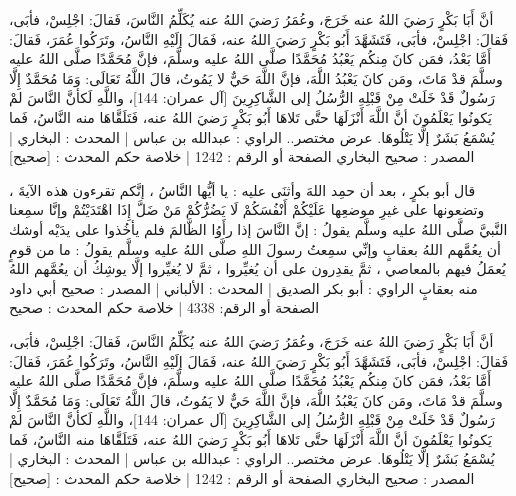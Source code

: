أنَّ أَبَا بَكْرٍ رَضيَ اللهُ عنه خَرَجَ، وعُمَرُ رَضيَ اللهُ عنه يُكَلِّمُ النَّاسَ، فَقالَ: اجْلِسْ، فأبَى، فَقالَ: اجْلِسْ، فأبَى، فَتَشَهَّدَ أَبُو بَكْرٍ رَضيَ اللهُ عنه، فَمَالَ إلَيْهِ النَّاسُ، وتَرَكُوا عُمَرَ، فَقالَ: أَمَّا بَعْدُ، فمَن كانَ مِنكُم يَعْبُدُ مُحَمَّدًا صلَّى اللهُ عليه وسلَّمَ، فإنَّ مُحَمَّدًا صلَّى اللهُ عليه وسلَّمَ قدْ مَاتَ، ومَن كانَ يَعْبُدُ اللَّهَ، فإنَّ اللَّهَ حَيٌّ لا يَمُوتُ، قالَ اللَّهُ تَعَالَى: {وَمَا مُحَمَّدٌ إِلَّا رَسُولٌ قَدْ خَلَتْ مِنْ قَبْلِهِ الرُّسُلُ} إلى {الشَّاكِرِينَ} [آل عمران: 144]، واللَّهِ لَكأنَّ النَّاسَ لمْ يَكونُوا يَعْلَمُونَ أنَّ اللَّهَ أَنْزَلَهَا حتَّى تَلاهَا أَبُو بَكْرٍ رَضيَ اللهُ عنه، فَتَلَقَّاهَا منه النَّاسُ، فَما يُسْمَعُ بَشَرٌ إلَّا يَتْلُوهَا.
عرض مختصر..
الراوي : عبدالله بن عباس | المحدث : البخاري | المصدر : صحيح البخاري
الصفحة أو الرقم : 1242 | خلاصة حكم المحدث : [صحيح] 

قال أبو بكرٍ ، بعد أن حمِد اللهَ وأثنَى عليه : يا أيُّها النَّاسُ ، إنَّكم تقرءون هذه الآيةَ ، وتضعونها على غيرِ موضعِها عَلَيْكُمْ أَنْفُسَكُمْ لَا يَضُرُّكُمْ مَنْ ضَلَّ إِذَا اهْتَدَيْتُمْ وإنَّا سمِعنا النَّبيَّ صلَّى اللهُ عليه وسلَّم يقولُ : إنَّ النَّاسَ إذا رأَوُا الظَّالمَ فلم يأخُذوا على يدَيْه أوشك أن يعُمَّهم اللهُ بعقابٍ وإنِّي سمِعتُ رسولَ اللهِ صلَّى اللهُ عليه وسلَّم يقولُ : ما من قومٍ يُعمَلُ فيهم بالمعاصي ، ثمَّ يقدِرون على أن يُغيِّروا ، ثمَّ لا يُغيِّروا إلَّا يوشِكُ أن يعُمَّهم اللهُ منه بعقابٍ
الراوي : أبو بكر الصديق | المحدث : الألباني | المصدر : صحيح أبي داود
الصفحة أو الرقم: 4338 | خلاصة حكم المحدث : صحيح


أنَّ أَبَا بَكْرٍ رَضيَ اللهُ عنه خَرَجَ، وعُمَرُ رَضيَ اللهُ عنه يُكَلِّمُ النَّاسَ، فَقالَ: اجْلِسْ، فأبَى، فَقالَ: اجْلِسْ، فأبَى، فَتَشَهَّدَ أَبُو بَكْرٍ رَضيَ اللهُ عنه، فَمَالَ إلَيْهِ النَّاسُ، وتَرَكُوا عُمَرَ، فَقالَ: أَمَّا بَعْدُ، فمَن كانَ مِنكُم يَعْبُدُ مُحَمَّدًا صلَّى اللهُ عليه وسلَّمَ، فإنَّ مُحَمَّدًا صلَّى اللهُ عليه وسلَّمَ قدْ مَاتَ، ومَن كانَ يَعْبُدُ اللَّهَ، فإنَّ اللَّهَ حَيٌّ لا يَمُوتُ، قالَ اللَّهُ تَعَالَى: {وَمَا مُحَمَّدٌ إِلَّا رَسُولٌ قَدْ خَلَتْ مِنْ قَبْلِهِ الرُّسُلُ} إلى {الشَّاكِرِينَ} [آل عمران: 144]، واللَّهِ لَكأنَّ النَّاسَ لمْ يَكونُوا يَعْلَمُونَ أنَّ اللَّهَ أَنْزَلَهَا حتَّى تَلاهَا أَبُو بَكْرٍ رَضيَ اللهُ عنه، فَتَلَقَّاهَا منه النَّاسُ، فَما يُسْمَعُ بَشَرٌ إلَّا يَتْلُوهَا.
عرض مختصر..
الراوي : عبدالله بن عباس | المحدث : البخاري | المصدر : صحيح البخاري
الصفحة أو الرقم : 1242 | خلاصة حكم المحدث : [صحيح] 

